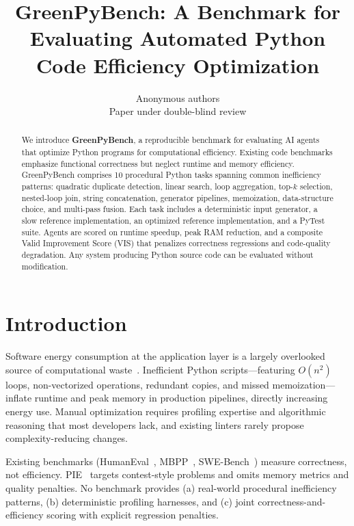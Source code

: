 \documentclass{article}
\title{\textbf{GreenPyBench: A Benchmark for Evaluating Automated Python Code Efficiency Optimization}}
\author{
Anonymous authors\\
Paper under double-blind review
}
\date{}
\begin{document}
\maketitle

\begin{abstract}
We introduce \textbf{GreenPyBench}, a reproducible benchmark for evaluating AI agents that optimize Python programs for computational efficiency. Existing code benchmarks emphasize functional correctness but neglect runtime and memory efficiency. GreenPyBench comprises 10 procedural Python tasks spanning common inefficiency patterns: quadratic duplicate detection, linear search, loop aggregation, top-$k$ selection, nested-loop join, string concatenation, generator pipelines, memoization, data-structure choice, and multi-pass fusion. Each task includes a deterministic input generator, a slow reference implementation, an optimized reference implementation, and a PyTest suite. Agents are scored on runtime speedup, peak RAM reduction, and a composite Valid Improvement Score (VIS) that penalizes correctness regressions and code-quality degradation. Any system producing Python source code can be evaluated without modification.
\end{abstract}

\section{Introduction}

Software energy consumption at the application layer is a largely overlooked source of computational waste~\cite{strubell2019energy,schwartz2020green}. Inefficient Python scripts---featuring $O(n^2)$ loops, non-vectorized operations, redundant copies, and missed memoization---inflate runtime and peak memory in production pipelines, directly increasing energy use. Manual optimization requires profiling expertise and algorithmic reasoning that most developers lack, and existing linters rarely propose complexity-reducing changes.

Existing benchmarks (HumanEval~\cite{chen2021evaluating}, MBPP~\cite{austin2021program}, SWE-Bench~\cite{jimenez2024swebench}) measure correctness, not efficiency. PIE~\cite{shypula2023pie} targets contest-style problems and omits memory metrics and quality penalties. No benchmark provides (a) real-world procedural inefficiency patterns, (b) deterministic profiling harnesses, and (c) joint correctness-and-efficiency scoring with explicit regression penalties.
\end{document}
